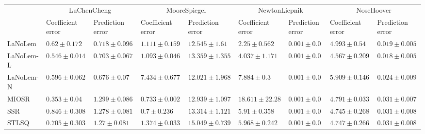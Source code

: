 \begin{table*}
{\begin{tabular}{lllllllll}
 & \multicolumn{2}{c}{LuChenCheng} & \multicolumn{2}{c}{MooreSpiegel} & \multicolumn{2}{c}{NewtonLiepnik} & \multicolumn{2}{c}{NoseHoover} \\
 & Coefficient error & Prediction error & Coefficient error & Prediction error & Coefficient error & Prediction error & Coefficient error & Prediction error \\
\midrule
LaNoLem & $0.62\pm 0.172$ & $0.718\pm 0.096$ & $1.111\pm 0.159$ & $12.545\pm 1.61$ & $\mathbf{2.25}\pm 0.562$ & $0.001\pm 0.0$ & $4.993\pm 0.54$ & $0.019\pm 0.005$ \\
LaNoLem-L & $0.546\pm 0.014$ & $0.703\pm 0.067$ & $1.093\pm 0.046$ & $13.359\pm 1.355$ & $4.037\pm 1.171$ & $0.001\pm 0.0$ & $\mathbf{4.567}\pm 0.209$ & $\mathbf{0.018}\pm 0.005$ \\
LaNoLem-N & $0.596\pm 0.062$ & $\mathbf{0.676}\pm 0.07$ & $7.434\pm 0.677$ & $\mathbf{12.021}\pm 1.968$ & $7.884\pm 0.3$ & $\mathbf{0.001}\pm 0.0$ & $5.909\pm 0.146$ & $0.024\pm 0.009$ \\
MIOSR & $\mathbf{0.353}\pm 0.04$ & $1.299\pm 0.086$ & $0.733\pm 0.002$ & $12.939\pm 1.097$ & $18.611\pm 22.28$ & $0.001\pm 0.0$ & $4.791\pm 0.033$ & $0.031\pm 0.007$ \\
SSR & $0.846\pm 0.308$ & $1.278\pm 0.081$ & $\mathbf{0.7}\pm 0.236$ & $13.314\pm 1.121$ & $5.91\pm 0.358$ & $0.001\pm 0.0$ & $4.745\pm 0.268$ & $0.031\pm 0.008$ \\
STLSQ & $0.705\pm 0.303$ & $1.27\pm 0.081$ & $1.374\pm 0.033$ & $15.049\pm 0.739$ & $5.968\pm 0.242$ & $0.001\pm 0.0$ & $4.747\pm 0.266$ & $0.031\pm 0.008$ \\

\bottomrule
\end{tabular}
}
\end{table*}

